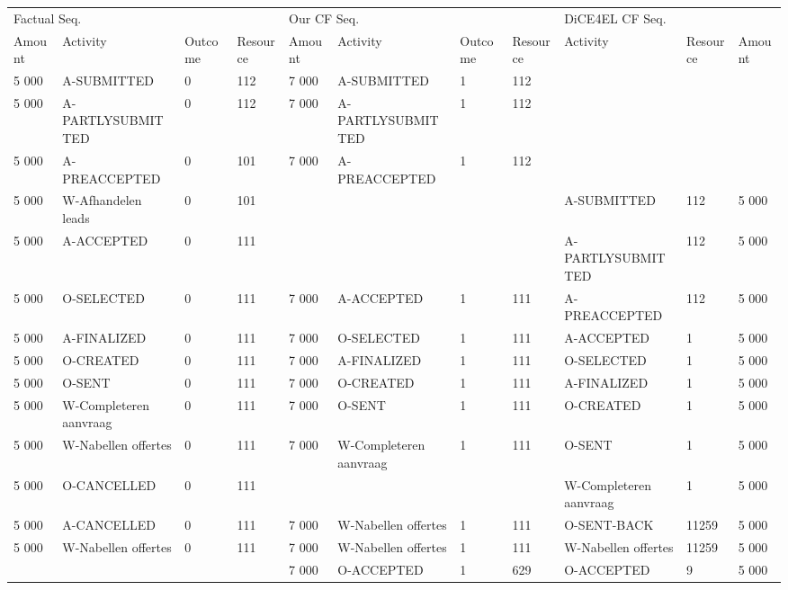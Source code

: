 \begin{tabular}{lllllllllll}
\toprule
\multicolumn{4}{l}{Factual Seq.} & \multicolumn{4}{l}{Our CF Seq.} & \multicolumn{3}{l}{DiCE4EL CF Seq.} \\
Amount & Activity & Outcome & Resource & Amount & Activity & Outcome & Resource & Activity & Resource & Amount \\
\midrule
5 000 & A-SUBMITTED & 0 & 112 & 7 000 & A-SUBMITTED & 1 & 112 &  &  &  \\
5 000 & A-PARTLYSUBMITTED & 0 & 112 & 7 000 & A-PARTLYSUBMITTED & 1 & 112 &  &  &  \\
5 000 & A-PREACCEPTED & 0 & 101 & 7 000 & A-PREACCEPTED & 1 & 112 &  &  &  \\
5 000 & W-Afhandelen leads & 0 & 101 &  &  &  &  & A-SUBMITTED & 112 & 5 000 \\
5 000 & A-ACCEPTED & 0 & 111 &  &  &  &  & A-PARTLYSUBMITTED & 112 & 5 000 \\
5 000 & O-SELECTED & 0 & 111 & 7 000 & A-ACCEPTED & 1 & 111 & A-PREACCEPTED & 112 & 5 000 \\
5 000 & A-FINALIZED & 0 & 111 & 7 000 & O-SELECTED & 1 & 111 & A-ACCEPTED & 1 & 5 000 \\
5 000 & O-CREATED & 0 & 111 & 7 000 & A-FINALIZED & 1 & 111 & O-SELECTED & 1 & 5 000 \\
5 000 & O-SENT & 0 & 111 & 7 000 & O-CREATED & 1 & 111 & A-FINALIZED & 1 & 5 000 \\
5 000 & W-Completeren aanvraag & 0 & 111 & 7 000 & O-SENT & 1 & 111 & O-CREATED & 1 & 5 000 \\
5 000 & W-Nabellen offertes & 0 & 111 & 7 000 & W-Completeren aanvraag & 1 & 111 & O-SENT & 1 & 5 000 \\
5 000 & O-CANCELLED & 0 & 111 &  &  &  &  & W-Completeren aanvraag & 1 & 5 000 \\
5 000 & A-CANCELLED & 0 & 111 & 7 000 & W-Nabellen offertes & 1 & 111 & O-SENT-BACK & 11259 & 5 000 \\
5 000 & W-Nabellen offertes & 0 & 111 & 7 000 & W-Nabellen offertes & 1 & 111 & W-Nabellen offertes & 11259 & 5 000 \\
 &  &  &  & 7 000 & O-ACCEPTED & 1 & 629 & O-ACCEPTED & 9 & 5 000 \\
\bottomrule
\end{tabular}
